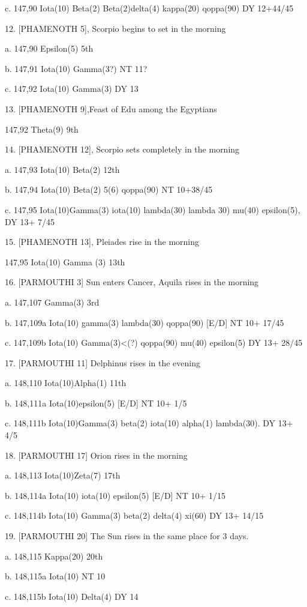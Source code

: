 \documentclass[12pt]{article}
\begin{document}
c. 147,90 Iota(10) Beta(2) Beta(2)delta(4) kappa(20) qoppa(90) DY 12+44/45

12. [PHAMENOTH 5], Scorpio begins to set in the morning

a. 147,90 Epsilon(5) 5th

b. 147,91 Iota(10) Gamma(3?) NT 11?

c. 147,92 Iota(10) Gamma(3) DY 13

13. [PHAMENOTH 9],Feast of Edu among the Egyptians

147,92 Theta(9) 9th

14. [PHAMENOTH 12], Scorpio sets completely in the morning

a. 147,93 Iota(10) Beta(2) 12th

b. 147,94 Iota(10) Beta(2) 5(6) qoppa(90) NT 10+38/45

c. 147,95 Iota(10)Gamma(3) iota(10) lambda(30) lambda 30) mu(40) epsilon(5), DY 13+ 7/45

15. [PHAMENOTH 13], Pleiades rise in the morning

147,95 Iota(10) Gamma (3) 13th

16. [PARMOUTHI 3] Sun enters Cancer, Aquila rises in the morning

a. 147,107 Gamma(3) 3rd

b. 147,109a Iota(10) gamma(3) lambda(30) qoppa(90) [E/D] NT 10+ 17/45

c. 147,109b Iota(10) Gamma(3)<(?) qoppa(90) mu(40) epsilon(5) DY 13+ 28/45

17. [PARMOUTHI 11] Delphinus rises in the evening

a. 148,110 Iota(10)Alpha(1) 11th

b. 148,111a Iota(10)epsilon(5) [E/D] NT 10+ 1/5

c. 148,111b Iota(10)Gamma(3) beta(2) iota(10) alpha(1) lambda(30).  DY 13+ 4/5

18. [PARMOUTHI 17] Orion rises in the morning

a. 148,113 Iota(10)Zeta(7) 17th

b. 148,114a Iota(10) iota(10) epsilon(5) [E/D] NT 10+ 1/15

c. 148,114b Iota(10) Gamma(3) beta(2) delta(4) xi(60) DY 13+ 14/15

19. [PARMOUTHI 20] The Sun rises in the same place for 3 days.

a. 148,115 Kappa(20) 20th

b. 148,115a Iota(10) NT 10

c. 148,115b Iota(10) Delta(4) DY 14
\end{document}
